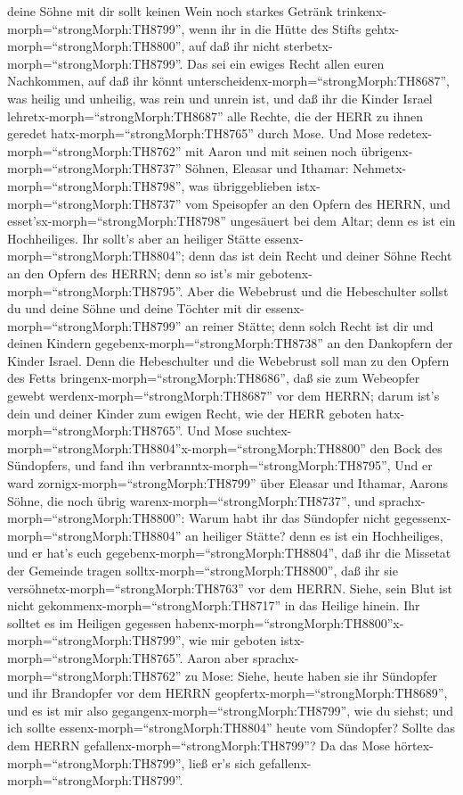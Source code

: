 deine Söhne mit dir sollt keinen Wein noch starkes Getränk
trinkenx-morph=``strongMorph:TH8799'', wenn ihr in die Hütte des Stifts
gehtx-morph=``strongMorph:TH8800'', auf daß ihr nicht
sterbetx-morph=``strongMorph:TH8799''. Das sei ein ewiges Recht allen
euren Nachkommen,  auf daß ihr könnt
unterscheidenx-morph=``strongMorph:TH8687'', was heilig und unheilig,
was rein und unrein ist,  und daß ihr die Kinder Israel
lehretx-morph=``strongMorph:TH8687'' alle Rechte, die der HERR zu ihnen
geredet hatx-morph=``strongMorph:TH8765'' durch Mose.  Und
Mose redetex-morph=``strongMorph:TH8762'' mit Aaron und mit seinen noch
übrigenx-morph=``strongMorph:TH8737'' Söhnen, Eleasar und Ithamar:
Nehmetx-morph=``strongMorph:TH8798'', was übriggeblieben
istx-morph=``strongMorph:TH8737'' vom Speisopfer an den Opfern des
HERRN, und esset'sx-morph=``strongMorph:TH8798'' ungesäuert bei dem
Altar; denn es ist ein Hochheiliges.  Ihr sollt's aber an
heiliger Stätte essenx-morph=``strongMorph:TH8804''; denn das ist dein
Recht und deiner Söhne Recht an den Opfern des HERRN; denn so ist's mir
gebotenx-morph=``strongMorph:TH8795''.  Aber die Webebrust
und die Hebeschulter sollst du und deine Söhne und deine Töchter mit dir
essenx-morph=``strongMorph:TH8799'' an reiner Stätte; denn solch Recht
ist dir und deinen Kindern gegebenx-morph=``strongMorph:TH8738'' an den
Dankopfern der Kinder Israel.  Denn die Hebeschulter und
die Webebrust soll man zu den Opfern des Fetts
bringenx-morph=``strongMorph:TH8686'', daß sie zum Webeopfer gewebt
werdenx-morph=``strongMorph:TH8687'' vor dem HERRN; darum ist's dein und
deiner Kinder zum ewigen Recht, wie der HERR geboten
hatx-morph=``strongMorph:TH8765''.  Und Mose
suchtex-morph=``strongMorph:TH8804''x-morph=``strongMorph:TH8800'' den
Bock des Sündopfers, und fand ihn
verbranntx-morph=``strongMorph:TH8795'', Und er ward
zornigx-morph=``strongMorph:TH8799'' über Eleasar und Ithamar, Aarons
Söhne, die noch übrig warenx-morph=``strongMorph:TH8737'', und
sprachx-morph=``strongMorph:TH8800'':  Warum habt ihr das
Sündopfer nicht gegessenx-morph=``strongMorph:TH8804'' an heiliger
Stätte? denn es ist ein Hochheiliges, und er hat's euch
gegebenx-morph=``strongMorph:TH8804'', daß ihr die Missetat der Gemeinde
tragen solltx-morph=``strongMorph:TH8800'', daß ihr sie
versöhnetx-morph=``strongMorph:TH8763'' vor dem HERRN. 
Siehe, sein Blut ist nicht gekommenx-morph=``strongMorph:TH8717'' in das
Heilige hinein. Ihr solltet es im Heiligen gegessen
habenx-morph=``strongMorph:TH8800''x-morph=``strongMorph:TH8799'', wie
mir geboten istx-morph=``strongMorph:TH8765''.  Aaron aber
sprachx-morph=``strongMorph:TH8762'' zu Mose: Siehe, heute haben sie ihr
Sündopfer und ihr Brandopfer vor dem HERRN
geopfertx-morph=``strongMorph:TH8689'', und es ist mir also
gegangenx-morph=``strongMorph:TH8799'', wie du siehst; und ich sollte
essenx-morph=``strongMorph:TH8804'' heute vom Sündopfer? Sollte das dem
HERRN gefallenx-morph=``strongMorph:TH8799''?  Da das Mose
hörtex-morph=``strongMorph:TH8799'', ließ er's sich
gefallenx-morph=``strongMorph:TH8799''.

